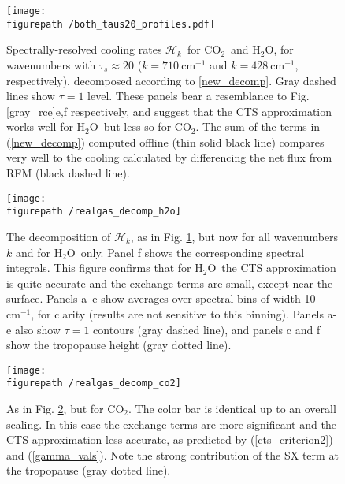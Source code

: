\documentclass{ametsoc}
\newcommand{\eqnref}[1]{(\ref{#1})}
\newcommand{\cminverse}{\ensuremath{\mathrm{cm^{-1}}}}
\newcommand{\cotwo}{\ensuremath{\mathrm{CO_2}}}
\newcommand{\htwo}{\ensuremath{\mathrm{H_2O}}}
\newcommand{\ch}{\ensuremath{\mathcal{H}}}
\newcommand{\chk}{\ensuremath{\ch_k}}
\newcommand{\taus}{\ensuremath{\tau_s}}
\newcommand{\figurepath}{../plots/}
\begin{document}
\begin{figure}[h]
	\begin{center}
			\texttt{[image: \\figurepath /both\_taus20\_profiles.pdf]}
		\caption{Spectrally-resolved cooling rates \chk\ for \cotwo\  and \htwo, for  wavenumbers with $\taus\approx20$ ($k=710\ \cminverse$ and $k=428\ \cminverse$, respectively), decomposed according to  \eqref{new_decomp}. Gray dashed lines show $\tau=1$ level. These panels bear a resemblance to Fig. \ref{gray_rce}e,f respectively, and suggest that the  CTS approximation works well for \htwo\ but less so for \cotwo. The sum of the terms in \eqnref{new_decomp} computed offline (thin solid black line) compares very well to the cooling calculated by differencing the net flux  from RFM (black dashed line).
		\label{both_taus20_profiles}
		}
	\end{center}
\end{figure}


\begin{figure}[h]
	\begin{center}
			\texttt{[image: \\figurepath /realgas\_decomp\_h2o]}
		\caption{ The decomposition of \chk, as in Fig. \ref{both_taus20_profiles}, but now for all wavenumbers $k$ and for \htwo\ only. Panel f shows the corresponding spectral integrals.  This figure confirms that for \htwo\ the CTS approximation is quite accurate and the exchange terms are small, except near the surface.  Panels a--e show averages over spectral bins of width 10 \cminverse, for clarity (results are not sensitive to this binning). Panels a-e also show $\tau=1$ contours (gray dashed line), and panels c and f show the tropopause height (gray dotted line).
		\label{realgas_decomp_h2o}
		}
	\end{center}
\end{figure}

\begin{figure}[h]
	\begin{center}
			\texttt{[image: \\figurepath /realgas\_decomp\_co2]}
		\caption{As in Fig. \ref{realgas_decomp_h2o}, but for \cotwo. The color bar is identical up to an overall scaling. In this case the exchange terms are more significant and the CTS approximation less accurate, as predicted by \eqnref{cts_criterion2} and \eqnref{gamma_vals}. Note the strong contribution of the SX term at the tropopause (gray dotted line). 
				\label{realgas_decomp_co2}
		}
	\end{center}
\end{figure}
\end{document}
